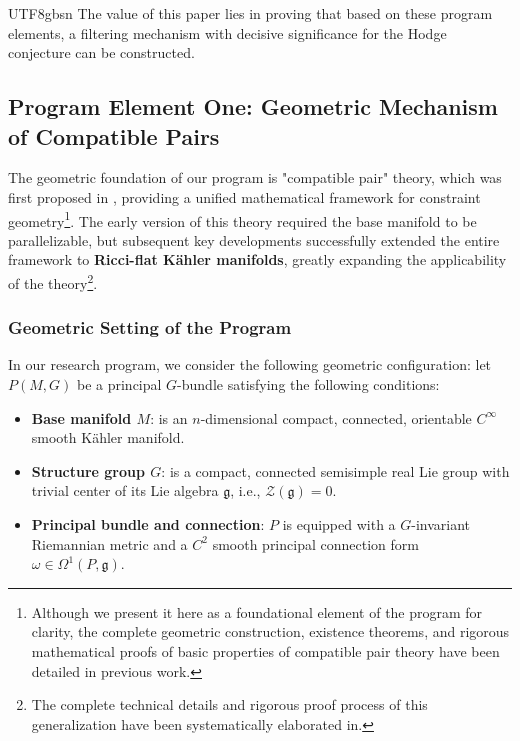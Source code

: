 \documentclass[a4paper,12pt]{extarticle}
\theoremstyle{definition}
\begin{document}
\begin{CJK}{UTF8}{gbsn}
The value of this paper lies in proving that based on these program elements, a filtering mechanism with decisive significance for the Hodge conjecture can be constructed.

\subsection{Program Element One: Geometric Mechanism of Compatible Pairs}
\label{subsec:global_assumptions}

The geometric foundation of our program is "compatible pair" theory, which was first proposed in \cite{zheng2025dynamical}, providing a unified mathematical framework for constraint geometry\footnote{Although we present it here as a foundational element of the program for clarity, the complete geometric construction, existence theorems, and rigorous mathematical proofs of basic properties of compatible pair theory have been detailed in previous work\cite{zheng2025dynamical}.}. The early version of this theory required the base manifold to be parallelizable, but subsequent key developments \cite{zheng2025extend} successfully extended the entire framework to \textbf{Ricci-flat Kähler manifolds}, greatly expanding the applicability of the theory\footnote{The complete technical details and rigorous proof process of this generalization have been systematically elaborated in\cite{zheng2025extend}.}.

\subsubsection{Geometric Setting of the Program}
In our research program, we consider the following geometric configuration: let $P(M,G)$ be a principal $G$-bundle satisfying the following conditions:
\begin{itemize}
    \item \textbf{Base manifold $M$}: is an $n$-dimensional compact, connected, orientable $C^\infty$ smooth Kähler manifold.
    \item \textbf{Structure group $G$}: is a compact, connected semisimple real Lie group with trivial center of its Lie algebra $\mathfrak{g}$, i.e., $\mathcal{Z}(\mathfrak{g}) = 0$.
    \item \textbf{Principal bundle and connection}: $P$ is equipped with a $G$-invariant Riemannian metric and a $C^2$ smooth principal connection form $\omega \in \Omega^1(P, \mathfrak{g})$.
\end{itemize}


\end{CJK}
\end{document}
